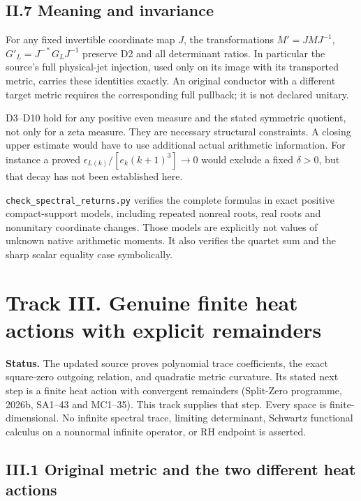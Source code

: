 \subsection{II.7 Meaning and
invariance}\label{ii.7-meaning-and-invariance}

For any fixed invertible coordinate map \(J\), the transformations
\(M'=JMJ^{-1}\), \(G'_L=J^{-*}G_LJ^{-1}\) preserve D2 and all
determinant ratios. In particular the source's full physical-jet
injection, used only on its image with its transported metric, carries
these identities exactly. An original conductor with a different target
metric requires the corresponding full pullback; it is not declared
unitary.

D3--D10 hold for any positive even measure and the stated symmetric
quotient, not only for a zeta measure. They are necessary structural
constraints. A closing upper estimate would have to use additional
actual arithmetic information. For instance a proved
\(\epsilon_{L(k)}/[e_k(k+1)^3]\to0\) would exclude a fixed \(\delta>0\),
but that decay has not been established here.

\texttt{check\_spectral\_returns.py} verifies the complete formulas in
exact positive compact-support models, including repeated nonreal roots,
real roots and nonunitary coordinate changes. Those models are
explicitly not values of unknown native arithmetic moments. It also
verifies the quartet sum and the sharp scalar equality case
symbolically.

\newpage

\section{Track III. Genuine finite heat actions with explicit
remainders}\label{track-iii.-genuine-finite-heat-actions-with-explicit-remainders}

\textbf{Status.} The updated source proves polynomial trace
coefficients, the exact square-zero outgoing relation, and quadratic
metric curvature. Its stated next step is a finite heat action with
convergent remainders (Split-Zero programme, 2026b, SA1--43 and
MC1--35). This track supplies that step. Every space is
finite-dimensional. No infinite spectral trace, limiting determinant,
Schwartz functional calculus on a nonnormal infinite operator, or RH
endpoint is asserted.

\subsection{III.1 Original metric and the two different heat
actions}\label{iii.1-original-metric-and-the-two-different-heat-actions}

